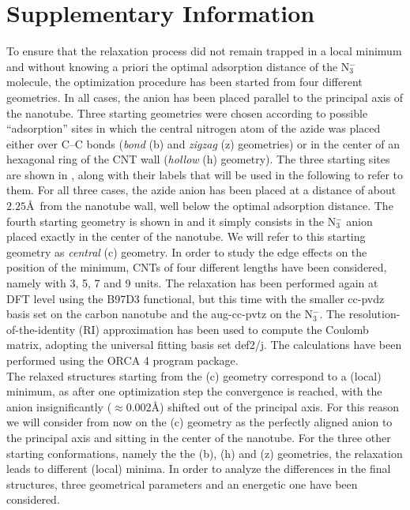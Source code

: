 \documentclass[utf8]{article}
\begin{document}
\section{Supplementary Information}
To ensure that the relaxation process did not remain trapped in a local minimum and without knowing a priori the optimal adsorption distance of the N$_3^-$ molecule, the optimization procedure has been started from four different geometries.
In all cases, the anion has been placed parallel to the principal axis of the nanotube.
Three starting geometries were chosen according to possible ``adsorption'' sites in which the central nitrogen atom of the azide was placed either over C--C bonds (\textit{bond} (b) and \textit{zigzag} (z) geometries) or in the center of an hexagonal ring of the CNT wall (\textit{hollow} (h) geometry). The three starting sites are shown in , along with their labels that will be used in the following to refer to them. For all three cases, the azide anion has been placed at a distance of about $2.25$\AA\ from the nanotube wall, well below the optimal adsorption distance.
The fourth starting geometry is shown in  and it simply consists in the N$_3^-$ anion placed exactly in the center of the nanotube. We will refer to this starting geometry as \textit{central} (c) geometry.
In order to study the edge effects on the position of the minimum, CNTs of four different lengths have been considered, namely with 3, 5, 7 and 9 units.
The relaxation has been performed again at DFT level using the B97D3 functional, but this time with the smaller cc-pvdz\cite{DunningJr1989} basis set on the carbon nanotube and the aug-cc-pvtz\cite{DunningJr1989} on the N$_3^-$.
The resolution-of-the-identity (RI) approximation has been used to compute the Coulomb matrix, adopting the universal fitting basis set def2/j\cite{Weigend2006}. The calculations have been performed using the ORCA 4 program package\cite{ORCA}.\\
The relaxed structures starting from the (c) geometry correspond to a (local) minimum, as after one optimization step the convergence is reached, with the \ntm anion insignificantly ($\approx 0.002$\AA) shifted out of the principal axis. For this reason we will consider from now on the (c) geometry as the perfectly aligned anion to the principal axis and sitting in the center of the nanotube.
For the three other starting conformations, namely the the (b), (h) and (z) geometries, the relaxation leads to different (local) minima.
In order to analyze the differences in the final structures, three geometrical parameters and an energetic one have been considered.
\end{document}
